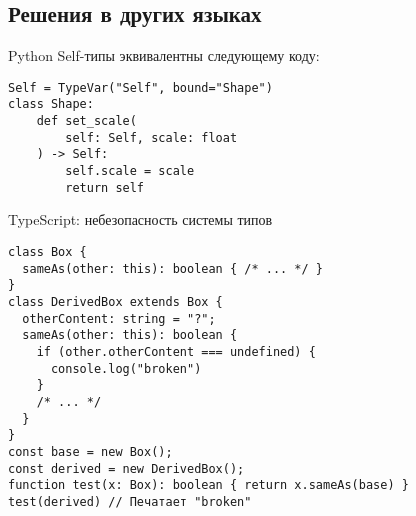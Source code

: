 \documentclass[aspectratio=169,usenames,dvipsnames]{beamer}
\begin{document}
    \subsection{Решения в других языках}

    \begin{frame}[fragile]{Python}
        Self-типы эквивалентны следующему коду:
        \begin{verbatim}
Self = TypeVar("Self", bound="Shape")
class Shape:
    def set_scale(
        self: Self, scale: float
    ) -> Self:
        self.scale = scale
        return self
        \end{verbatim}
    \end{frame}

    \begin{frame}[fragile]{TypeScript: небезопасность системы типов}
        \begin{verbatim}
class Box {
  sameAs(other: this): boolean { /* ... */ }
}
class DerivedBox extends Box {
  otherContent: string = "?";
  sameAs(other: this): boolean {
    if (other.otherContent === undefined) {
      console.log("broken")
    }
    /* ... */
  }
}
const base = new Box();
const derived = new DerivedBox();
function test(x: Box): boolean { return x.sameAs(base) }
test(derived) // Печатает "broken"
        \end{verbatim}
    \end{frame}
\end{document}

